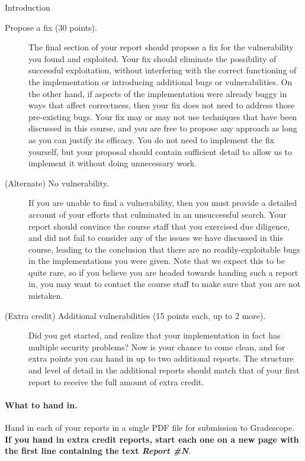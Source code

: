 \documentclass[11pt]{article}
\begin{document}
\begin{problem}{Introduction}
\begin{description}
      \item[Propose a fix (30 points).] The final section of your report should propose a fix for the vulnerability you found and exploited. Your fix should eliminate the possibility of successful exploitation, without interfering with the correct functioning of the implementation or introducing additional bugs or vulnerabilities. On the other hand, if aspects of the implementation were already buggy in ways that affect correctness, then your fix does not need to address those pre-existing bugs. Your fix may or may not use techniques that have been discussed in this course, and you are free to propose any approach as long as you can justify its efficacy. You do not need to implement the fix yourself, but your proposal should contain sufficient detail to allow us to implement it without doing unnecessary work.
      \item[(Alternate) No vulnerability.] If you are unable to find a vulnerability, then you must provide a detailed account of your efforts that culminated in an unsuccessful search. Your report should convince the course staff that you exercised due diligence, and did not fail to consider any of the issues we have discussed in this course, leading to the conclusion that there are no readily-exploitable bugs in the implementations you were given. Note that we expect this to be quite rare, so if you believe you are headed towards handing such a report in, you may want to contact the course staff to make sure that you are not mistaken.
      \item[(Extra credit) Additional vulnerabilities (15 points each, up to 2 more).] Did you get started, and realize that your implementation in fact has multiple security problems? Now is your chance to come clean, and for extra points you can hand in up to two additional reports. The structure and level of detail in the additional reports should match that of your first report to receive the full amount of extra credit.
    \end{description}
\end{problem}

\paragraph{What to hand in.} Hand in each of your reports in a single PDF file for submission to Gradescope. \textbf{If you hand in extra credit reports, start each one on a new page with the first line containing the text \emph{Report \#N}}.
\end{document}
